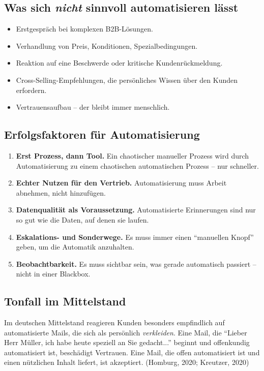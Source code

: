\documentclass[11pt,a4paper,oneside]{article}
\newcommand{\quelle}[1]{{\footnotesize\color{lpGray}(#1)}}
\begin{document}
\subsection{Was sich \emph{nicht} sinnvoll automatisieren lässt}

\begin{itemize}
  \item Erstgespräch bei komplexen B2B-Lösungen.
  \item Verhandlung von Preis, Konditionen, Spezialbedingungen.
  \item Reaktion auf eine Beschwerde oder kritische Kundenrückmeldung.
  \item Cross-Selling-Empfehlungen, die persönliches Wissen über den Kunden erfordern.
  \item Vertrauensaufbau -- der bleibt immer menschlich.
\end{itemize}

\subsection{Erfolgsfaktoren für Automatisierung}

\begin{enumerate}
  \item \textbf{Erst Prozess, dann Tool.} Ein chaotischer manueller Prozess wird durch Automatisierung zu einem chaotischen automatischen Prozess -- nur schneller.
  \item \textbf{Echter Nutzen für den Vertrieb.} Automatisierung muss Arbeit abnehmen, nicht hinzufügen.
  \item \textbf{Datenqualität als Voraussetzung.} Automatisierte Erinnerungen sind nur so gut wie die Daten, auf denen sie laufen.
  \item \textbf{Eskalations- und Sonderwege.} Es muss immer einen ``manuellen Knopf'' geben, um die Automatik anzuhalten.
  \item \textbf{Beobachtbarkeit.} Es muss sichtbar sein, was gerade automatisch passiert -- nicht in einer Blackbox.
\end{enumerate}

\subsection{Tonfall im Mittelstand}

Im deutschen Mittelstand reagieren Kunden besonders empfindlich auf automatisierte Mails, die sich als persönlich \emph{verkleiden}. Eine Mail, die ``Lieber Herr Müller, ich habe heute speziell an Sie gedacht...'' beginnt und offenkundig automatisiert ist, beschädigt Vertrauen. Eine Mail, die offen automatisiert ist und einen nützlichen Inhalt liefert, ist akzeptiert. \quelle{Homburg, 2020; Kreutzer, 2020}
\end{document}
